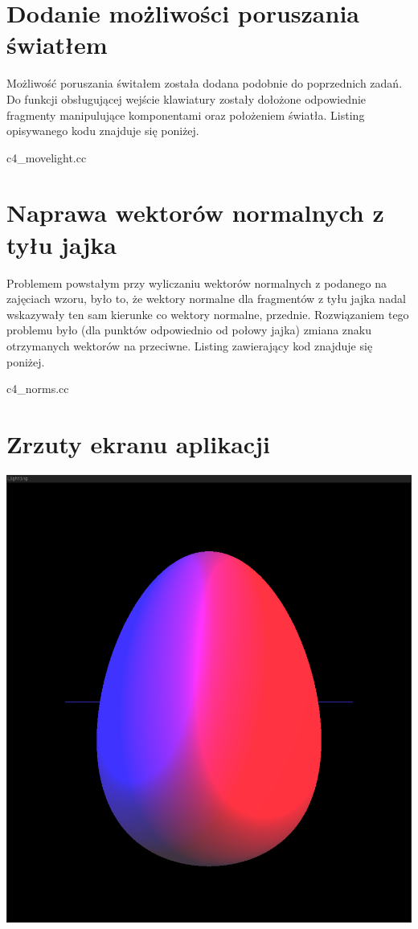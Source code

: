 \documentclass[polish,polish,a4paper]{report}
\begin{document}
\pagebreak
\section{Dodanie możliwości poruszania światłem}
Możliwość poruszania świtałem została dodana podobnie do poprzednich zadań. Do funkcji obsługującej wejście klawiatury zostały dołożone odpowiednie
fragmenty manipulujące komponentami oraz położeniem światła. Listing opisywanego kodu znajduje się poniżej.


{c4_movelight.cc}

\pagebreak
\section{Naprawa wektorów normalnych z tyłu jajka}
Problemem powstałym przy wyliczaniu wektorów normalnych z podanego na zajęciach wzoru, było to, że wektory normalne dla fragmentów z tyłu jajka nadal
wskazywały ten sam kierunke co wektory normalne, przednie.
Rozwiązaniem tego problemu było (dla punktów odpowiednio od połowy jajka) zmiana znaku
otrzymanych wektorów na przeciwne. Listing zawierający kod znajduje się poniżej.


{c4_norms.cc}

\pagebreak
\section{Zrzuty ekranu aplikacji}
\begin{center}
\includegraphics[scale=2]{egg_light1}
\end{center}
\end{document}
